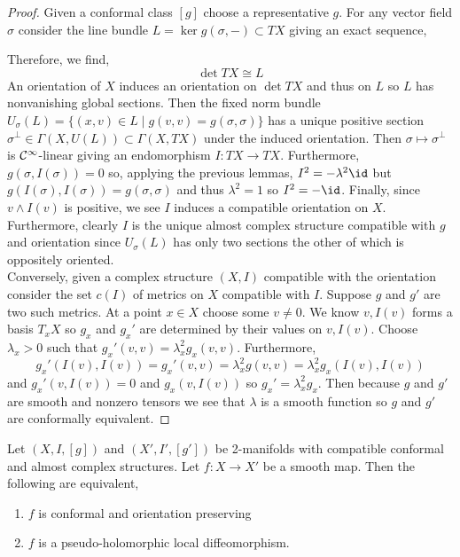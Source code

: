\documentclass[12pt]{article}
\begin{document}
\begin{proof}
Given a conformal class $[g]$ choose a representative $g$. For any vector field $\sigma$ consider the line bundle $L = \ker{g(\sigma, -)} \subset T X$ giving an exact sequence,
\begin{center}
\end{center} 
Therefore, we find,
\[ \det{T X} \cong L \]
An orientation of $X$ induces an orientation on $\det{T X}$ and thus on $L$ so $L$ has nonvanishing global sections. Then the fixed norm bundle $U_\sigma(L) = \{ (x, v) \in L \mid g(v, v) = g(\sigma, \sigma) \}$ has a unique positive section $\sigma^\perp \in \Gamma(X, U(L)) \subset \Gamma(X, TX)$ under the induced orientation. Then $\sigma \mapsto \sigma^\perp$ is $\mathcal{C}^{\infty}$-linear giving an endomorphism $I : TX \to TX$. Furthermore, $g(\sigma, I(\sigma)) = 0$ so, applying the previous lemmas, $I^2 = - \lambda^2 \id$ but $g(I(\sigma), I(\sigma)) = g(\sigma, \sigma)$ and thus $\lambda^2 = 1$ so $I^2 = -\id$. Finally, since $v \wedge I(v)$ is positive, we see $I$ induces a compatible orientation on $X$. Furthermore, clearly $I$ is the unique almost complex structure compatible with $g$ and orientation since $U_\sigma(L)$ has only two sections the other of which is oppositely oriented. 
\bigskip\\
Conversely, given a complex structure $(X, I)$ compatible with the orientation consider the set $c(I)$ of metrics on $X$ compatible with $I$. Suppose $g$ and $g'$ are two such metrics. At a point $x \in X$ choose some $v \neq 0$. We know $v, I(v)$ forms a basis $T_x X$ so $g_x$ and $g_x'$ are determined by their values on $v, I(v)$. Choose $\lambda_x > 0$ such that $g_x'(v, v) = \lambda_x^2 g_x(v, v)$. Furthermore,
\[ g_x'(I(v), I(v)) = g_x'(v, v) = \lambda_x^2 g(v, v) = \lambda_x^2 g_x(I(v), I(v)) \]
and $g_x'(v, I(v)) = 0$ and $g_x(v, I(v))$ so $g_x' = \lambda_x^2 g_x$. Then because $g$ and $g'$ are smooth and nonzero tensors we see that $\lambda$ is a smooth function so $g$ and $g'$ are conformally equivalent. 
\end{proof}

\begin{prop}
Let $(X, I, [g])$ and $(X', I', [g'])$ be 2-manifolds with compatible conformal and almost complex structures. Let $f : X \to X'$ be a smooth map. Then the following are equivalent,
\begin{enumerate}
\item $f$ is conformal and orientation preserving
\item $f$ is a pseudo-holomorphic local diffeomorphism.
\end{enumerate}
\end{prop}
\end{document}
